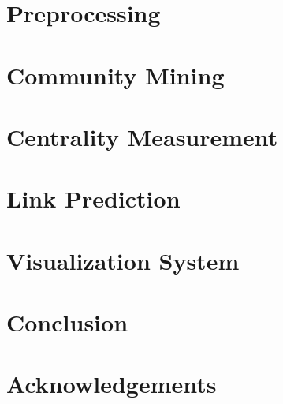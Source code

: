 \documentclass[11pt]{article}
\begin{document}
\section{Preprocessing}

\section{Community Mining}

\section{Centrality Measurement}

\section{Link Prediction}

\section{Visualization System}

\section{Conclusion}

\section*{Acknowledgements}


% 
% 



\end{document}
